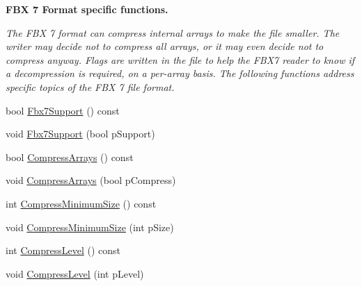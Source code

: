 \begin{Indent}\textbf{ F\+BX 7 Format specific functions.}\par
{\em The F\+BX 7 format can compress internal arrays to make the file smaller. The writer may decide not to compress all arrays, or it may even decide not to compress anyway. Flags are written in the file to help the F\+B\+X7 reader to know if a decompression is required, on a per-\/array basis. The following functions address specific topics of the F\+BX 7 file format. }\begin{DoxyCompactItemize}
\item 
bool \hyperlink{class_fbx_i_o_a8aec1669dd3e06d2b77e861dde5c328b}{Fbx7\+Support} () const
\item 
void \hyperlink{class_fbx_i_o_a8a5651ec131b0226da71e6ccbc3d3e48}{Fbx7\+Support} (bool p\+Support)
\item 
bool \hyperlink{class_fbx_i_o_a08824b000f12973ce914f100718f40b4}{Compress\+Arrays} () const
\item 
void \hyperlink{class_fbx_i_o_a79a44fb21056b562e7a5829c4a00a228}{Compress\+Arrays} (bool p\+Compress)
\item 
int \hyperlink{class_fbx_i_o_aa852808fd8920701f6b8df769d5368f6}{Compress\+Minimum\+Size} () const
\item 
void \hyperlink{class_fbx_i_o_ab8b60eb39e05136271ef1258a78a4550}{Compress\+Minimum\+Size} (int p\+Size)
\item 
int \hyperlink{class_fbx_i_o_a6d8e6a96dbea9478c5816ab72cca55a2}{Compress\+Level} () const
\item 
void \hyperlink{class_fbx_i_o_aafc916c10c65b2a303ef85e17bed810c}{Compress\+Level} (int p\+Level)
\end{DoxyCompactItemize}
\end{Indent}
